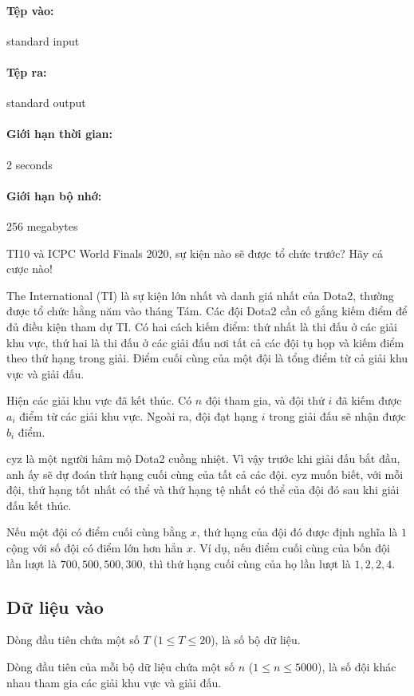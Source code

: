 \documentclass[11pt]{article}
\begin{document}
\paragraph{Tệp vào:} standard input
\paragraph{Tệp ra:} standard output
\paragraph{Giới hạn thời gian:} 2 seconds
\paragraph{Giới hạn bộ nhớ:} 256 megabytes

TI10 và ICPC World Finals 2020, sự kiện nào sẽ được tổ chức trước? Hãy cá
cược nào!

The International (TI) là sự kiện lớn nhất và danh giá nhất của Dota2, thường
được tổ chức hằng năm vào tháng Tám. Các đội Dota2 cần cố gắng kiếm điểm để
đủ điều kiện tham dự TI. Có hai cách kiếm điểm: thứ nhất là thi đấu ở các giải
khu vực, thứ hai là thi đấu ở các giải đấu nơi tất cả các đội tụ họp và kiếm
điểm theo thứ hạng trong giải. Điểm cuối cùng của một đội là tổng điểm từ cả
giải khu vực và giải đấu.

Hiện các giải khu vực đã kết thúc. Có \(n\) đội tham gia, và đội thứ \(i\) đã
kiếm được \(a_i\) điểm từ các giải khu vực. Ngoài ra, đội đạt hạng \(i\) trong
giải đấu sẽ nhận được \(b_i\) điểm.

cyz là một người hâm mộ Dota2 cuồng nhiệt. Vì vậy trước khi giải đấu bắt đầu,
anh ấy sẽ dự đoán thứ hạng cuối cùng của tất cả các đội. cyz muốn biết, với
mỗi đội, thứ hạng tốt nhất có thể và thứ hạng tệ nhất có thể của đội đó sau
khi giải đấu kết thúc.

Nếu một đội có điểm cuối cùng bằng \(x\), thứ hạng của đội đó được định nghĩa
là \(1\) cộng với số đội có điểm lớn hơn hẳn \(x\). Ví dụ, nếu điểm cuối cùng
của bốn đội lần lượt là \(700,500,500,300\), thì thứ hạng cuối cùng của họ lần
lượt là \(1,2,2,4\).

\subsection*{Dữ liệu vào}

Dòng đầu tiên chứa một số \(T\) (\(1\le T\le 20\)), là số bộ dữ liệu.

Dòng đầu tiên của mỗi bộ dữ liệu chứa một số \(n\) (\(1\le n\le 5000\)), là
số đội khác nhau tham gia các giải khu vực và giải đấu.
\end{document}
